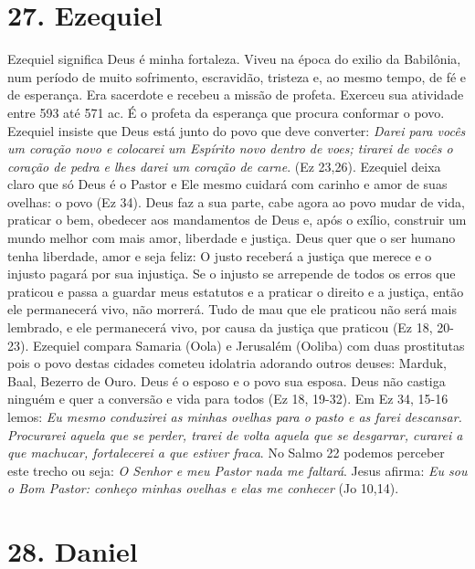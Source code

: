 \documentclass[
]{book}
\begin{document}
\hypertarget{ezequiel}{%
\section*{27. Ezequiel}\label{ezequiel}}

Ezequiel significa Deus é minha fortaleza. Viveu na época do exilio da Babilônia, num período de muito sofrimento, escravidão, tristeza e, ao mesmo tempo, de fé e de esperança. Era sacerdote e recebeu a missão de profeta. Exerceu sua atividade entre 593 até 571 ac. É o profeta da esperança que procura conformar o povo. Ezequiel insiste que Deus está junto do povo que deve converter: \emph{Darei para vocês um coração novo e colocarei um Espírito novo dentro de voes; tirarei de vocês o coração de pedra e lhes darei um coração de carne}. (Ez 23,26). Ezequiel deixa claro que só Deus é o Pastor e Ele mesmo cuidará com carinho e amor de suas ovelhas: o povo (Ez 34). Deus faz a sua parte, cabe agora ao povo mudar de vida, praticar o bem, obedecer aos mandamentos de Deus e, após o exílio, construir um mundo melhor com mais amor, liberdade e justiça. Deus quer que o ser humano tenha liberdade, amor e seja feliz: O justo receberá a justiça que merece e o injusto pagará por sua injustiça. Se o injusto se arrepende de todos os erros que praticou e passa a guardar meus estatutos e a praticar o direito e a justiça, então ele permanecerá vivo, não morrerá. Tudo de mau que ele praticou não será mais lembrado, e ele permanecerá vivo, por causa da justiça que praticou (Ez 18, 20-23). Ezequiel compara Samaria (Oola) e Jerusalém (Ooliba) com duas prostitutas pois o povo destas cidades cometeu idolatria adorando outros deuses: Marduk, Baal, Bezerro de Ouro. Deus é o esposo e o povo sua esposa. Deus não castiga ninguém e quer a conversão e vida para todos (Ez 18, 19-32). Em Ez 34, 15-16 lemos: \emph{Eu mesmo conduzirei as minhas ovelhas para o pasto e as farei descansar. Procurarei aquela que se perder, trarei de volta aquela que se desgarrar, curarei a que machucar, fortalecerei a que estiver fraca}. No Salmo 22 podemos perceber este trecho ou seja: \emph{O Senhor e meu Pastor nada me faltará}. Jesus afirma: \emph{Eu sou o Bom Pastor: conheço minhas ovelhas e elas me conhecer} (Jo 10,14).

\hypertarget{daniel}{%
\section*{28. Daniel}\label{daniel}}
\end{document}
